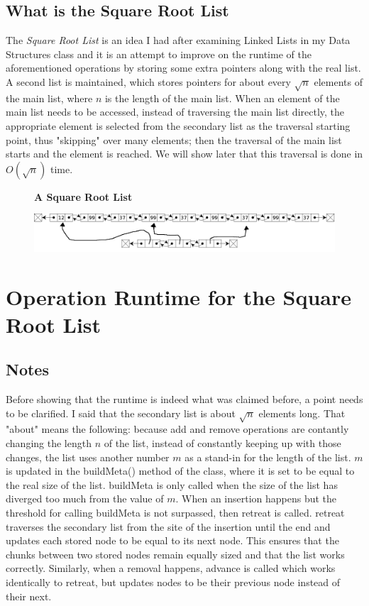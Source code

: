 \documentclass[10pt]{article}
\begin{document}
\subsection{What is the Square Root List}
The \textit{Square Root List} is an idea I had after examining Linked Lists in my Data Structures class and it is an attempt to improve on the runtime of the aforementioned operations by storing some extra pointers along with the real list. A second list is maintained, which stores pointers for about every $\sqrt{n}$ elements of the main list, where $n$ is the length of the main list. When an element of the main list needs to be accessed, instead of traversing the main list directly, the appropriate element is selected from the secondary list as the traversal starting point, thus "skipping" over many elements; then the traversal of the main list starts and the element is reached. We will show later that this traversal is done in $O(\sqrt{n})$ time.
\begin{figure}[hbp]
	\centering
	\textbf{A Square Root List}\par\medskip
	\includegraphics[width=.7\textwidth]{./img/square_root_list.png}
\end{figure}
\section{Operation Runtime for the Square Root List}
\subsection{Notes}
Before showing that the runtime is indeed what was claimed before, a point needs to be clarified. I said that the secondary list is about $\sqrt{n}$ elements long. That "about" means the following: because add and remove operations are contantly changing the length $n$ of the list, instead of constantly keeping up with those changes, the list uses another number $m$ as a stand-in for the length of the list. $m$ is updated in the buildMeta() method of the class, where it is set to be equal to the real size of the list. buildMeta is only called when the size of the list has diverged too much from the value of $m$. When an insertion happens but the threshold for calling buildMeta is not surpassed, then retreat is called. retreat traverses the secondary list from the site of the insertion until the end and updates each stored node to be equal to its next node. This ensures that the chunks between two stored nodes remain equally sized and that the list works correctly. Similarly, when a removal happens, advance is called which works identically to retreat, but updates nodes to be their previous node instead of their next.
\end{document}
